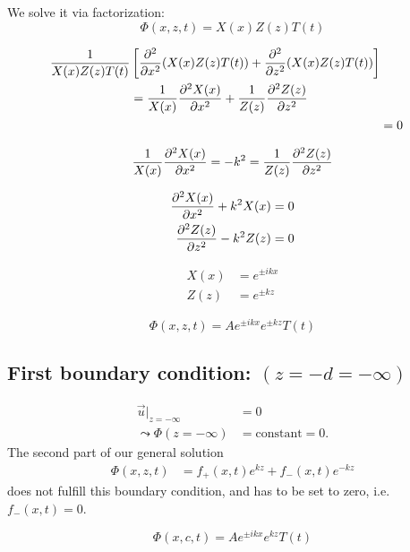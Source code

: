 We solve it via factorization:
\begin{equation}
\Phi(x,z,t)=X(x)Z(z)T(t)
\end{equation}

\begin{align}
\begin{split}
\frac{1}{X(x)Z(z)T(t)}  &\left[ \frac{\partial^2 }{\partial x^2}(X(x)Z(z)T(t)) + \frac{\partial^2 }{\partial z^2}(X(x)Z(z)T(t))\right] \\
&=  \frac{1}{X(x)}\frac{\partial^2 X(x)}{\partial x^2} + \frac{1}{Z(z)}\frac{\partial^2 Z(z)}{\partial z^2}
\end{split} \\
&= 0
\end{align}

\begin{equation}
\frac{1}{X(x)}\frac{\partial^2 X(x)}{\partial x^2} = -k^2 = \frac{1}{Z(z)}\frac{\partial^2 Z(z)}{\partial z^2}
\end{equation}

\begin{align}
\frac{\partial^2 X(x)}{\partial x^2}+k^2X(x) &= 0 \\
\frac{\partial^2 Z(z)}{\partial z^2}-k^2Z(z) &= 0
\end{align}

\begin{align}
X(x) &= e^{\pm ikx} \\
Z(z) &= e^{\pm kz}
\end{align}

\begin{equation}
\Phi(x,z,t) = Ae^{\pm ikx}e^{\pm kz} T(t)
\end{equation}

\subsection{First boundary condition: $(z=-d=-\infty)$}

\begin{align}
\vec{u}|_{z=-\infty} &= 0\\
\leadsto
\Phi(z=-\infty)&=\mathrm{constant} =0.
\end{align}
The second part of our general solution
\begin{align}
\Phi(x,z,t) &= f_+(x,t)e^{kz}+f_-(x,t)e^{-kz}
\end{align}
does not fulfill this boundary condition, and has to be set to zero, i.e. $f_-(x,t)=0$.

\begin{equation}\label{eq:surface-phi}
\Phi(x,c,t) = A e^{\pm ikx} e^{kz} T(t)
\end{equation}

